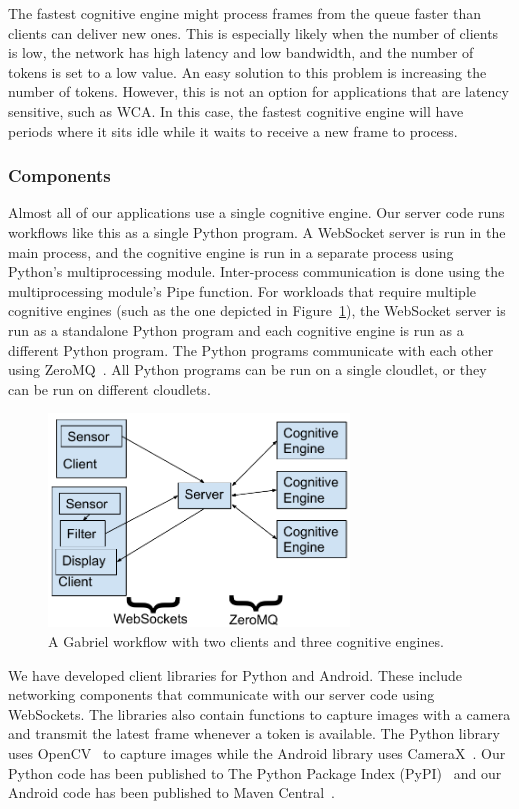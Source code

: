 The fastest cognitive engine might process frames from the queue faster than
clients can deliver new ones.
This is especially likely when the number of clients is low, the network has
high latency and low bandwidth, and the number of tokens is set to a low value.
An easy solution to this problem is increasing the number of tokens.
However, this is not an option for applications that are latency sensitive, such
as WCA.
In this case, the fastest cognitive engine will have periods where it sits idle
while it waits to receive a new frame to process.

\subsubsection{Components}

Almost all of our applications use a single cognitive engine. Our server code
runs workflows like this as a single Python program. A WebSocket server is run
in the main process, and the cognitive engine is run in a separate process using
Python's multiprocessing module. Inter-process communication is done using the
multiprocessing module's Pipe function. For workloads that require multiple
cognitive engines (such as the one depicted in
Figure~\ref{fig:runtime_architecture}),
the WebSocket server is run as a standalone Python program and each cognitive
engine is run as a different Python program.
The Python programs communicate with each other using ZeroMQ~\cite{zmq}.
All Python programs can be run on a single cloudlet, or they can be run on
different cloudlets.

\begin{figure}[h!]
  \includegraphics[width=8cm]{figures/runtime_architecture.pdf}
  \caption{A Gabriel workflow with two clients and three cognitive engines.
  }\label{fig:runtime_architecture}
\end{figure}

We have developed client libraries for Python and Android. These include
networking components that communicate with our server code using WebSockets.
The libraries also contain functions to capture images with a camera and
transmit the latest frame whenever a token is available. The Python library uses
OpenCV~\cite{opencv_library} to capture images while the Android library uses
CameraX~\cite{camerax}. Our Python code has been published to The Python Package
Index (PyPI)~\cite{gabriel_server, gabriel_python_client} and our Android code
has been published to Maven Central~\cite{gabriel_android_client}.

